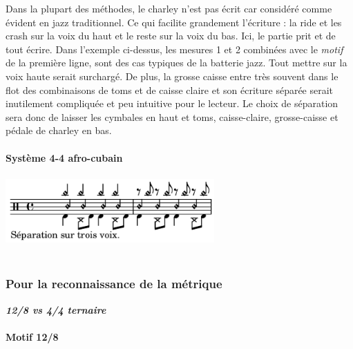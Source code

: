 Dans la plupart des méthodes, le charley n’est pas écrit car considéré comme évident en jazz traditionnel. Ce qui facilite grandement l’écriture : la ride et les crash sur la voix du haut et le reste sur la voix du bas. Ici, le partie prit et de tout écrire. Dans l’exemple ci-dessus, les mesures 1 et 2 combinées avec le \textit{motif} de la première ligne, sont des cas typiques de la batterie jazz. Tout mettre sur la voix haute serait surchargé. De plus, la grosse caisse entre très souvent dans le flot des combinaisons de toms et de caisse claire et son écriture séparée serait inutilement compliquée et peu intuitive pour le lecteur. Le choix de séparation sera donc de laisser les cymbales en haut et toms, caisse-claire, grosse-caisse et pédale de charley en bas.\\\\

\textbf{Système 4-4 afro-cubain}\\\\
\includegraphics[height=25mm, width=80mm]{z_images/1_description_notation/separation/separation_2.png}\\\\

\subsubsection{Pour la reconnaissance de la métrique}

\textit{\textbf{12/8 vs 4/4 ternaire}}\\\\
\textbf{Motif 12/8}\\\\
\newpage


